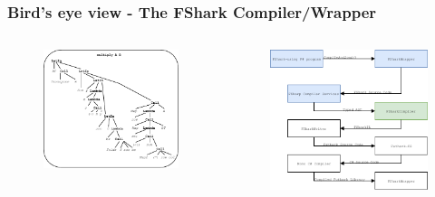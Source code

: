 \documentclass[10pt, compress]{beamer}
\begin{document}
\begin{frame}[fragile]
  \frametitle{Bird's eye view - The FShark Compiler/Wrapper}
\begin{columns}[t] %
\begin{column}{.38\textwidth}
  \begin{figure}
\includegraphics[scale=0.6]{./images/multiplyAST}
  \end{figure}
\end{column}
\hfill
\begin{column}{.60\textwidth}
  \begin{figure}
    \includegraphics[scale=0.7]{./images/pipeline/pipeline5}
  \end{figure}
\end{column}
\end{columns}
\end{frame}
\end{document}
